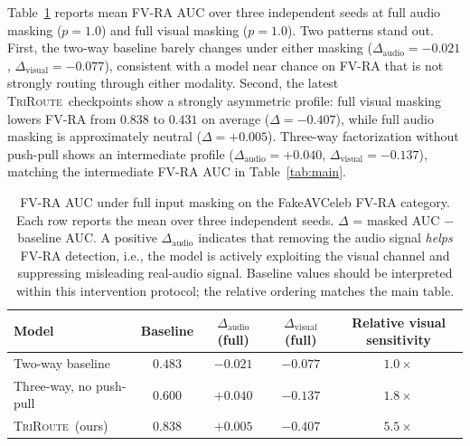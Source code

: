 \documentclass{article}
\newcommand{\method}{\textsc{TriRoute}}
\begin{document}
Table~\ref{tab:perturbation} reports mean FV-RA AUC over three independent seeds at full audio masking ($p=1.0$) and full visual masking ($p=1.0$). Two patterns stand out. First, the two-way baseline barely changes under either masking ($\Delta_{\mathrm{audio}}=-0.021$, $\Delta_{\mathrm{visual}}=-0.077$), consistent with a model near chance on FV-RA that is not strongly routing through either modality. Second, the latest \method\ checkpoints show a strongly asymmetric profile: full visual masking lowers FV-RA from $0.838$ to $0.431$ on average ($\Delta=-0.407$), while full audio masking is approximately neutral ($\Delta=+0.005$). Three-way factorization without push-pull shows an intermediate profile ($\Delta_{\mathrm{audio}}=+0.040$, $\Delta_{\mathrm{visual}}=-0.137$), matching the intermediate FV-RA AUC in Table~\ref{tab:main}.

\begin{table}[t]
    \centering
    \caption{FV-RA AUC under full input masking on the FakeAVCeleb FV-RA category. Each row reports the mean over three independent seeds. $\Delta$ = masked AUC $-$ baseline AUC. A positive $\Delta_{\mathrm{audio}}$ indicates that removing the audio signal \emph{helps} FV-RA detection, i.e., the model is actively exploiting the visual channel and suppressing misleading real-audio signal. Baseline values should be interpreted within this intervention protocol; the relative ordering matches the main table.}
    \label{tab:perturbation}
    \small
    \begin{tabular}{lcccc}
        \toprule
        Model & Baseline & $\Delta_{\mathrm{audio}}$ (full) & $\Delta_{\mathrm{visual}}$ (full) & Relative visual sensitivity \\
        \midrule
        Two-way baseline        & $0.483$ & $-0.021$ & $-0.077$ & $1.0\times$ \\
        Three-way, no push-pull & $0.600$ & $+0.040$ & $-0.137$ & $1.8\times$ \\
        \method\ (ours) & $\mathbf{0.838}$ & $\mathbf{+0.005}$ & $\mathbf{-0.407}$ & $\mathbf{5.5\times}$ \\
        \bottomrule
    \end{tabular}
\end{table}
\end{document}

